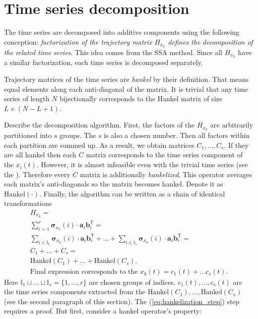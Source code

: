 \documentclass[referee, pdflatex, sn-mathphys-num]{sn-jnl}
\theoremstyle{definition}
\theoremstyle{plain}
\begin{document}
	\section{Time series decomposition}\label{sec:decomposition}
	
	The time series are decomposed into additive components using the following conception: \emph{factorization of the trajectory matrix $ H_{x_k} $ defines the decomposition of the related time series}. This idea comes from the SSA method. Since all $ H_{x_k} $ have a similar factorization, each time series is decomposed separately.
	
	Trajectory matrices of the time series are \emph{hankel} by their definition. That means equal elements along each anti-diagonal of the matrix. It is trivial that any time series of length $ N $ bijectionally corresponds to the Hankel matrix of size $ L \times (N - L + 1) $.
	
	Describe the decomposition algorithm. First, the factors of the $ H_{x_k} $ are arbitrarily partitioned into $ s $ groups. The $ s $ is also a chosen number. Then all factors within each partition are summed up. As a result, we obtain matrices $ C_1, \ldots, C_s $. If they are all hankel then each $ C $ matrix corresponds to the time series component of the $ x_i(t) $. However, it is almost infeasible even with the trivial time series (see the \cite{ecfb9dc578be43ae9ee8fc88b8ff9151}). Therefore every $ C $ matrix is additionally \emph{hankelized}. This operator averages each matrix's anti-diagonals so the matrix becomes hankel. Denote it as $ \text{Hankel}(\cdot) $. Finally, the algorithm can be written as a chain of identical transformations \begin{gather}
		H_{x_k} = \\
		\sum\limits_{i = 1}^{r} \boldsymbol{\sigma}_{x_k}(i) \cdot \mathbf{a}_i  \mathbf{b}_i^{\mathsf{T}} = \label{eq:decomp_alg_first_step} \\
		\sum\limits_{i \in \mathbb{I}_1} \boldsymbol{\sigma}_{x_k}(i) \cdot \mathbf{a}_i  \mathbf{b}_i^{\mathsf{T}} + \ldots + \sum\limits_{i \in \mathbb{I}_s} \boldsymbol{\sigma}_{x_k}(i) \cdot \mathbf{a}_i  \mathbf{b}_i^{\mathsf{T}} = \\
		C_1 + \ldots + C_s = \label{eq:hankelization_step} \\
	    \text{Hankel}(C_1) + \ldots + \text{Hankel}(C_s). \nonumber \\
	    \text{Final expression corresponds to the } x_k(t) = c_1(t) + \ldots c_s(t). \nonumber
	\end{gather} Here $ \mathbb{I}_1 \sqcup \ldots \sqcup \mathbb{I}_s = \{1, \ldots, r\} $ are chosen groups of indices. $ c_1(t), \ldots , c_s(t) $ are the time series components extracted from the $ \text{Hankel}(C_1), \ldots , \text{Hankel}(C_s) $ (see the second paragraph of this section). The (\ref{eq:hankelization_step}) step requires a proof. But first, consider a hankel operator's property:
	
\end{document}
